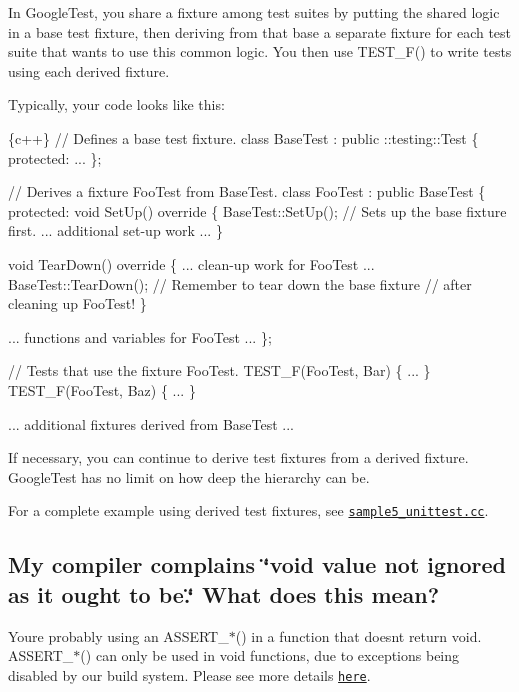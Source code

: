 In Google\+Test, you share a fixture among test suites by putting the shared logic in a base test fixture, then deriving from that base a separate fixture for each test suite that wants to use this common logic. You then use {\ttfamily T\+E\+S\+T\+\_\+\+F()} to write tests using each derived fixture.

Typically, your code looks like this\+:


\begin{DoxyCode}
\{c++\}
// Defines a base test fixture.
class BaseTest : public ::testing::Test \{
 protected:
  ...
\};

// Derives a fixture FooTest from BaseTest.
class FooTest : public BaseTest \{
 protected:
  void SetUp() override \{
    BaseTest::SetUp();  // Sets up the base fixture first.
    ... additional set-up work ...
  \}

  void TearDown() override \{
    ... clean-up work for FooTest ...
    BaseTest::TearDown();  // Remember to tear down the base fixture
                           // after cleaning up FooTest!
  \}

  ... functions and variables for FooTest ...
\};

// Tests that use the fixture FooTest.
TEST\_F(FooTest, Bar) \{ ... \}
TEST\_F(FooTest, Baz) \{ ... \}

... additional fixtures derived from BaseTest ...
\end{DoxyCode}


If necessary, you can continue to derive test fixtures from a derived fixture. Google\+Test has no limit on how deep the hierarchy can be.

For a complete example using derived test fixtures, see \href{https://github.com/google/googletest/blob/main/googletest/samples/sample5_unittest.cc}{\tt sample5\+\_\+unittest.\+cc}.

\subsection*{My compiler complains \char`\"{}void value not ignored as it ought to be.\char`\"{} What does this mean?}

You\textquotesingle{}re probably using an {\ttfamily A\+S\+S\+E\+R\+T\+\_\+$\ast$()} in a function that doesn\textquotesingle{}t return {\ttfamily void}. {\ttfamily A\+S\+S\+E\+R\+T\+\_\+$\ast$()} can only be used in {\ttfamily void} functions, due to exceptions being disabled by our build system. Please see more details \href{advanced.md#assertion-placement}{\tt here}.

